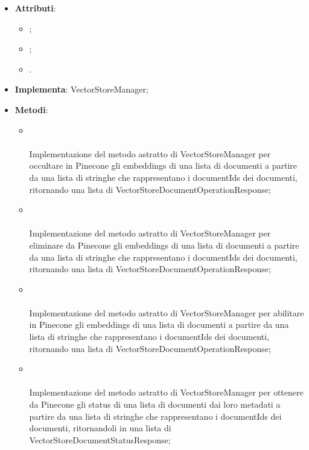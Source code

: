 \documentclass[10pt, a4paper]{article}
\begin{document}
\label{VectorStorePineconeManagerDettaglio}
\begin{itemize}
    \item \textbf{Attributi}:
    \begin{itemize}
        \item {};
        \item {};
        \item {}.
        
    \end{itemize}
    \item \textbf{Implementa}: VectorStoreManager;
    \item \textbf{Metodi}:
    \begin{itemize}
        \item {}\\ \\
        Implementazione del metodo astratto di VectorStoreManager per occultare in Pinecone gli embeddings di una lista di documenti a partire da una lista di stringhe che rappresentano i documentIds dei documenti, ritornando una lista di VectorStoreDocumentOperationResponse;

        \item {}\\ \\
        Implementazione del metodo astratto di VectorStoreManager per eliminare da Pinecone gli embeddings di una lista di documenti a partire da una lista di stringhe che rappresentano i documentIds dei documenti, ritornando una lista di VectorStoreDocumentOperationResponse;

        \item {}\\ \\
        Implementazione del metodo astratto di VectorStoreManager per abilitare in Pinecone gli embeddings di una lista di documenti a partire da una lista di stringhe che rappresentano i documentIds dei documenti, ritornando una lista di VectorStoreDocumentOperationResponse;

        \item {}\\ \\
        Implementazione del metodo astratto di VectorStoreManager per ottenere da Pinecone gli status di una lista di documenti dai loro metadati a partire da una lista di stringhe che rappresentano i documentIds dei documenti, ritornandoli in una lista di VectorStoreDocumentStatusResponse;


\end{itemize}
\end{itemize}
\end{document}
